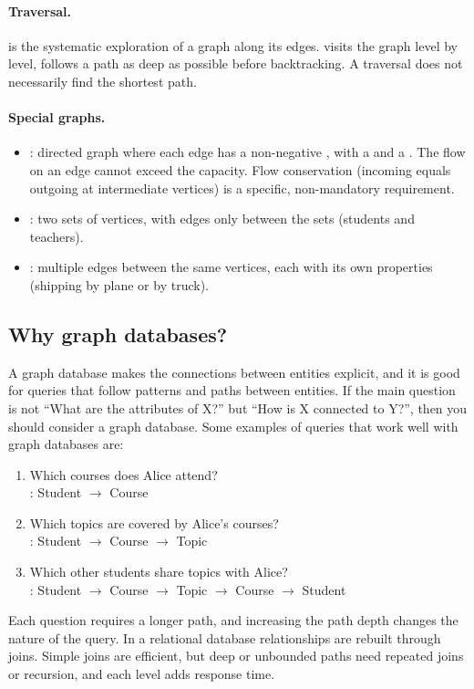 \paragraph{Traversal.}  is the systematic exploration of a graph along its edges.  visits the graph level by level,  follows a path as deep as possible before backtracking. A traversal does not necessarily find the shortest path.

\paragraph{Special graphs.}
\begin{itemize}
  \item {}: directed graph where each edge has a non-negative , with a  and a . The flow on an edge cannot exceed the capacity. Flow conservation (incoming equals outgoing at intermediate vertices) is a specific, non-mandatory requirement.
  \item {}: two sets of vertices, with edges only between the sets (students and teachers).
  \item {}: multiple edges between the same vertices, each with its own properties (shipping by plane or by truck).
\end{itemize}

\subsection{Why graph databases?}

A graph database makes the connections between entities explicit, and it is good for queries that follow patterns and paths between entities. If the main question is not ``What are the attributes of X?'' but ``How is X connected to Y?'', then you should consider a graph database. Some examples of queries that work well with graph databases are:
\begin{enumerate}
  \item Which courses does Alice attend?\\
        : Student $\rightarrow$ Course
  \item Which topics are covered by Alice's courses?\\
        : Student $\rightarrow$ Course $\rightarrow$ Topic
  \item Which other students share topics with Alice?\\
        : Student $\rightarrow$ Course $\rightarrow$ Topic $\rightarrow$ Course $\rightarrow$ Student
\end{enumerate}
Each question requires a longer path, and increasing the path depth changes the nature of the query. In a relational database relationships are rebuilt through joins. Simple joins are efficient, but deep or unbounded paths need repeated joins or recursion, and each level adds response time.

